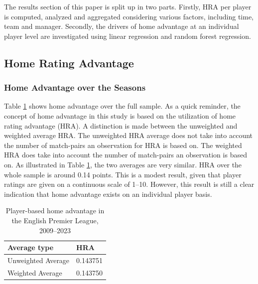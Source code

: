 The results section of this paper is split up in two parts. Firstly, HRA per player is computed, analyzed and aggregated considering various factors, including time, team and manager. Secondly, the drivers of home advantage at an individual player level are investigated using linear regression and random forest regression.

\subsection{Home Rating Advantage}

\subsubsection{Home Advantage over the Seasons}
Table \ref{tab:hra_full_sample} shows home advantage over the full sample. As a quick reminder, the concept of home advantage in this study is based on the utilization of home rating advantage (HRA). A distinction is made between the unweighted and weighted average HRA. The unweighted HRA average does not take into account the number of match-pairs an observation for HRA is based on. The weighted HRA does take into account the number of match-pairs an observation is based on. As illustrated in Table \ref{tab:hra_full_sample}, the two averages are very similar. HRA over the whole sample is around 0.14 points. This is a modest result, given that player ratings are given on a continuous scale of 1--10. However, this result is still a clear indication that home advantage exists on an individual player basis. \\ 

\begin{table}[htbp]
    \begin{spacing}{1.5}
    \centering
    \small
    \caption{Player-based home advantage in the English Premier League, 2009--2023}
    \label{tab:hra_full_sample}%
    \begin{tabular}{p{5cm}p{2cm}}
        \toprule
        \toprule
        \textbf{Average type} & \multicolumn{1}{l}{\textbf{HRA}} \\
        \midrule
        Unweighted Average & 0.143751 \\
        Weighted Average & 0.143750 \\
        \bottomrule
        \bottomrule
    \end{tabular}%
    \end{spacing}
\end{table}%

